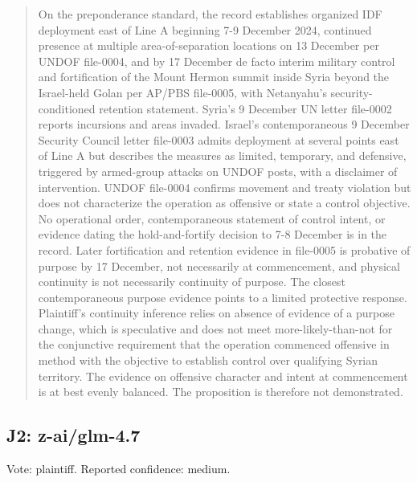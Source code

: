 \begin{quote}
On the preponderance standard, the record establishes organized IDF deployment east of Line A beginning 7-9 December 2024, continued presence at multiple area-of-separation locations on 13 December per UNDOF file-0004, and by 17 December de facto interim military control and fortification of the Mount Hermon summit inside Syria beyond the Israel-held Golan per AP/PBS file-0005, with Netanyahu’s security-conditioned retention statement. Syria’s 9 December UN letter file-0002 reports incursions and areas invaded. Israel’s contemporaneous 9 December Security Council letter file-0003 admits deployment at several points east of Line A but describes the measures as limited, temporary, and defensive, triggered by armed-group attacks on UNDOF posts, with a disclaimer of intervention. UNDOF file-0004 confirms movement and treaty violation but does not characterize the operation as offensive or state a control objective. No operational order, contemporaneous statement of control intent, or evidence dating the hold-and-fortify decision to 7-8 December is in the record. Later fortification and retention evidence in file-0005 is probative of purpose by 17 December, not necessarily at commencement, and physical continuity is not necessarily continuity of purpose. The closest contemporaneous purpose evidence points to a limited protective response. Plaintiff’s continuity inference relies on absence of evidence of a purpose change, which is speculative and does not meet more-likely-than-not for the conjunctive requirement that the operation commenced offensive in method with the objective to establish control over qualifying Syrian territory. The evidence on offensive character and intent at commencement is at best evenly balanced. The proposition is therefore not demonstrated.
\end{quote}

\subsection{J2: z-ai/glm-4.7}

Vote: plaintiff.  Reported confidence: medium.

